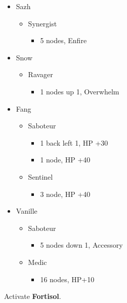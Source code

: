 	\begin{menu}
		\begin{itemize}
			\crystarium
			\begin{itemize}
				\item Sazh
				      \begin{itemize}
					      \item Synergist
					            \begin{itemize}
						            \item 5 nodes, Enfire
					            \end{itemize}
				      \end{itemize}
				\item Snow
				      \begin{itemize}
					      \item Ravager
					            \begin{itemize}
						            \item 1 nodes up 1, Overwhelm
					            \end{itemize}
				      \end{itemize}
				\item Fang
				      \begin{itemize}
					      \item Saboteur
					            \begin{itemize}
						            \item 1 back left 1, HP +30
						            \item 1 node, HP +40
					            \end{itemize}
					      \item Sentinel
					            \begin{itemize}
						            \item 3 node, HP +40
					            \end{itemize}
				      \end{itemize}
				\item Vanille
				      \begin{itemize}
					      \item Saboteur
					            \begin{itemize}
						            \item 5 nodes down 1, Accessory
					            \end{itemize}
					      \item Medic
					            \begin{itemize}
						            \item 16 nodes, HP+10
					            \end{itemize}
				      \end{itemize}
			\end{itemize}

		\end{itemize}
	\end{menu}
	 Activate \textbf{Fortisol}.

